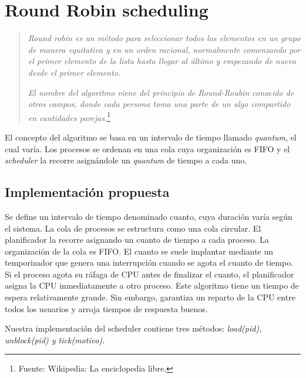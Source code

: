 \section{Round Robin scheduling}

\begin{quote}
	\textit{Round robin es un método para seleccionar todos los elementos en un grupo de manera equitativa y en un orden racional, normalmente comenzando por el primer elemento de la lista hasta llegar al último y empezando de nuevo desde el primer elemento.} 
	
	\textit{El nombre del algoritmo viene del principio de Round-Roubin conocido de otros campos, donde cada persona toma una parte de un algo compartido en cantidades parejas.}\footnote{Fuente: Wikipedia: La enciclopedia libre.}
	
\end{quote}

	El concepto del algoritmo se basa en un intervalo de tiempo llamado \textit{quantum}, el cual varía. Los procesos se ordenan en una cola cuya organización es FIFO y el \textit{scheduler} la recorre asignándole un \textit{quantum} de tiempo a cada uno.

\subsection{Implementación propuesta}

Se define un intervalo de tiempo denominado cuanto, cuya duración varía según el sistema. La cola de procesos se estructura como una cola circular. El planificador la recorre asignando un cuanto de tiempo a cada proceso. La organizaci\'on de la cola es FIFO. El cuanto se suele implantar mediante un temporizador que genera una interrupci\'on cuando se agota el cuanto de tiempo. Si el proceso agota su ráfaga de CPU antes de finalizar el cuanto, el planificador asigna la CPU inmediatamente a otro proceso. Este algoritmo tiene un tiempo de espera relativamente grande. Sin embargo, garantiza un reparto de la CPU entre todos los usuarios y arroja tiempos de respuesta buenos.

Nuestra implementación del scheduler contiene tres métodos: \textit{load(pid), unblock(pid) y tick(motivo).}